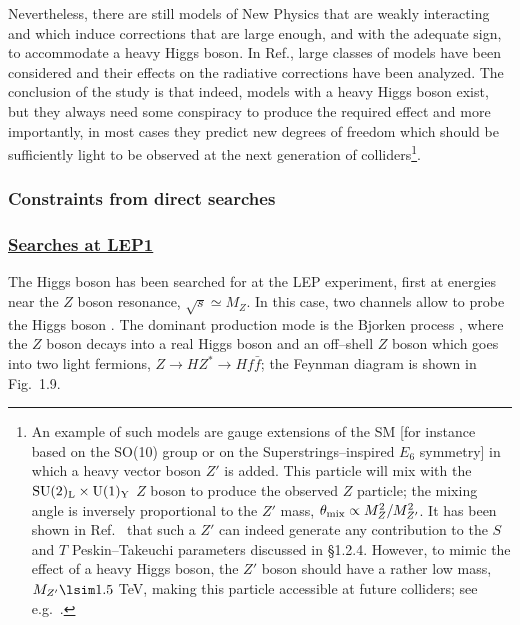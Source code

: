 Nevertheless, there are still models of New Physics that are weakly interacting
and which induce corrections that are large enough, and with the adequate sign,
to accommodate a heavy Higgs boson. In Ref.\cite{Models-Heavy-H}, large classes
of models have been considered and their effects on the radiative corrections
have been analyzed. The conclusion of the study is that indeed, models with
a heavy Higgs boson exist, but they always need some conspiracy to
produce the required effect and more importantly, in most cases they predict
new degrees of freedom which should be sufficiently light to be observed at the
next generation of colliders\footnote{An example of such models are gauge
extensions of the SM [for instance based on the SO(10) group or on the
Superstrings--inspired $E_6$ symmetry] in which a heavy vector boson $Z'$ is
added. This particle will mix with the ${\rm SU(2)_L\times U(1)_Y}$ $Z$ boson
to produce the observed $Z$ particle; the mixing angle is inversely
proportional to the $Z'$ mass, $\theta_{\rm mix} \propto M_Z^2/M_{Z'}^2$.  It
has been shown in Ref.~\cite{Models-Heavy-H} that such a $Z'$ can indeed
generate any contribution to the $S$ and $T$ Peskin--Takeuchi parameters
discussed in \S1.2.4. However, to mimic the effect of a heavy Higgs boson, the
$Z'$ boson should have a rather low mass, $M_{Z'} \lsim 1.5$ TeV, making this
particle accessible at future colliders; see e.g.~\cite{Zprime-papers}.}.   

\subsubsection{Constraints from direct searches}

\subsubsection*{\underline{Searches at LEP1}}

The Higgs boson has been searched for at the LEP experiment, first at energies 
near the $Z$ boson resonance, $\sqrt{s}\simeq M_Z$. In this case, two 
channels allow to probe the Higgs boson \cite{Z-Physics5}. The dominant
production mode is the Bjorken process \cite{Bjorken-process}, where the $Z$ 
boson decays into a real Higgs boson and an off--shell $Z$ boson which goes
into two light fermions, $Z \to HZ^* \to H f\bar{f}$; the Feynman diagram is
shown in Fig.~1.9.

